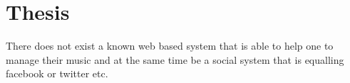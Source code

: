 \section{Thesis}
There does not exist a known web based system that is able to help one to manage their music and at the same time be a social system that is equalling facebook or twitter etc. 